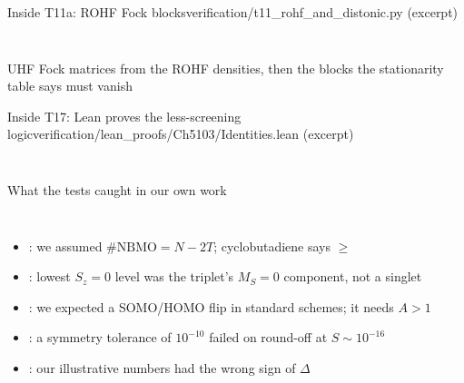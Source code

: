 \begin{frame}[fragile]{Inside T11a: ROHF Fock blocks}{verification/t11\_rohf\_and\_distonic.py (excerpt)}
  \inputminted[fontsize=\scriptsize,firstline=14,lastline=24]{python}{../verification/t11_rohf_and_distonic.py}
  \inputminted[fontsize=\scriptsize,firstline=51,lastline=54]{python}{../verification/t11_rohf_and_distonic.py}
  {\small UHF Fock matrices from the ROHF densities, then the blocks the stationarity table says must vanish}
\end{frame}

\begin{frame}[fragile]{Inside T17: Lean proves the less-screening logic}{verification/lean\_proofs/Ch5103/Identities.lean (excerpt)}
  \inputminted[fontsize=\scriptsize,firstline=72,lastline=77]{lean4}{../verification/lean_proofs/Ch5103/Identities.lean}
  \inputminted[fontsize=\scriptsize,firstline=79,lastline=83]{lean4}{../verification/lean_proofs/Ch5103/Identities.lean}
\end{frame}

\begin{frame}{What the tests caught in our own work}
  \begin{columns}[T]
    \small
    \begin{itemize}
      \item {}: we assumed $\#\text{NBMO}=N-2T$; cyclobutadiene says $\ge$
      \item<2-> : lowest $S_z=0$ level was the triplet's $M_S=0$ component, not a singlet
      \item<3-> : we expected a SOMO/HOMO flip in standard schemes; it needs $A>1$
      \item<4-> : a symmetry tolerance of $10^{-10}$ failed on round-off at $S\sim10^{-16}$
      \item<5-> : our illustrative numbers had the wrong sign of $\Delta$
    \end{itemize}
  \end{columns}
\end{frame}
